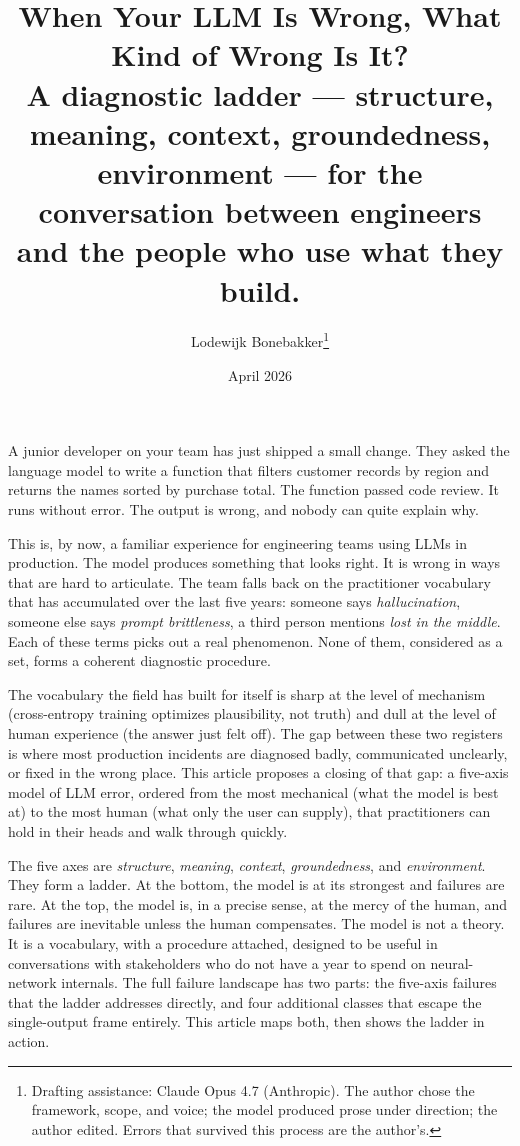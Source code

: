 \documentclass[11pt,a4paper]{article}
\title{When Your LLM Is Wrong, What Kind of Wrong Is It?\\[0.3em]
\large A diagnostic ladder --- structure, meaning, context, groundedness, environment --- for the conversation between engineers and the people who use what they build.}
\author{Lodewijk Bonebakker\thanks{Drafting assistance: Claude Opus 4.7 (Anthropic). The author chose the framework, scope, and voice; the model produced prose under direction; the author edited. Errors that survived this process are the author's.}}
\date{April 2026}
\begin{document}
\maketitle

\noindent
A junior developer on your team has just shipped a small change. They
asked the language model to write a function that filters customer
records by region and returns the names sorted by purchase total.
The function passed code review. It runs without error. The output
is wrong, and nobody can quite explain why.

This is, by now, a familiar experience for engineering teams using
LLMs in production. The model
produces something that looks right. It is wrong in ways that are
hard to articulate. The team falls back on the practitioner
vocabulary that has accumulated over the last five years: someone
says \emph{hallucination}, someone else says \emph{prompt
brittleness}, a third person mentions \emph{lost in the middle}.
Each of these terms picks out a real phenomenon. None of them,
considered as a set, forms a coherent diagnostic procedure.

The vocabulary the field has built for itself is sharp at the level
of mechanism (cross-entropy training optimizes plausibility, not
truth) and dull at the level of human experience (the answer just
felt off). The gap between these two registers is where most
production incidents are diagnosed badly, communicated unclearly,
or fixed in the wrong place. This article proposes a closing of
that gap: a five-axis model of LLM error, ordered from the most
mechanical (what the model is best at) to the most human (what only
the user can supply), that practitioners can hold in their heads
and walk through quickly.

The five axes are \emph{structure}, \emph{meaning}, \emph{context},
\emph{groundedness}, and \emph{environment}. They form a ladder. At
the bottom, the model is at its strongest and failures are rare. At
the top, the model is, in a precise sense, at the mercy of the
human, and failures are inevitable unless the human compensates.
The model is not a theory. It is a vocabulary, with a procedure
attached, designed to be useful in conversations with stakeholders
who do not have a year to spend on neural-network internals. The
full failure landscape has two parts: the five-axis failures that
the ladder addresses directly, and four additional classes that
escape the single-output frame entirely. This article maps both,
then shows the ladder in action.
\end{document}
